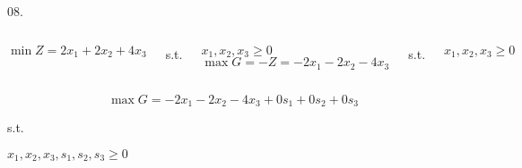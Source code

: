 \begin{frameExample}{08.}{}
  \begin{columns}
\[\min Z = 2x_1 + 2x_2 + 4x_3  \]

  s.t.

$    x_1, x_2, x_3  \geq 0$
 \[ \max G =  -Z = -2x_1 - 2x_2 - 4x_3 \]

  s.t.

$    x_1, x_2, x_3  \geq 0$
  \end{columns}
\end{frameExample}

\begin{frameExample}{08}{}
  \[ \max G= -2x_1 - 2x_2 - 4x_3 + 0s_1 + 0s_2 + 0s_3 \]

  s.t.

$    x_1, x_2, x_3, s_1, s_2, s_3  \geq 0$
\end{frameExample}


